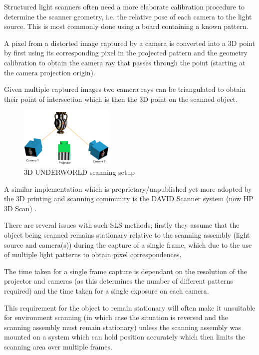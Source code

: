 \documentclass{entcs}
\begin{document}
Structured light scanners often need a more elaborate calibration procedure to
determine the scanner geometry, i.e. the relative pose of each camera to the
light source. This is most commonly done using a board containing a known
pattern.

A pixel from a distorted image captured by a camera is converted into a 3D point
by first using its corresponding pixel in the projected pattern and the geometry
calibration to obtain the camera ray that passes through the point (starting at
the camera projection origin).

Given multiple captured images two camera rays can be triangulated to obtain
their point of intersection which is then the 3D point on the scanned object.

\begin{figure}[h!]
  \centering
  \includegraphics[width=0.4\textwidth]{graphics/3d-underworld_scanning.eps}
  \caption{3D-UNDERWORLD scanning setup \cite{Gu2014}}
  \label{fig:3d-underworld_scanning}
\end{figure}

A similar implementation which is proprietary/unpublished yet more adopted by
the 3D printing and scanning community is the DAVID Scanner system
(now HP 3D Scan) \cite{HP3DScan}.

There are several issues with such SLS methods; firstly they assume that the
object being scanned remains stationary relative to the scanning assembly (light
source and camera(s)) during the capture of a single frame, which due to the use
of multiple light patterns to obtain pixel correspondences.

The time taken for a single frame capture is dependant on the resolution of the
projector and cameras (as this determines the number of different patterns
required) and the time taken for a single exposure on each camera.

This requirement for the object to remain stationary will often make it
unsuitable for environment scanning (in which case the situation is reversed and
the scanning assembly must remain stationary) unless the scanning assembly was
mounted on a system which can hold position accurately which then limits the
scanning area over multiple frames.
\end{document}

